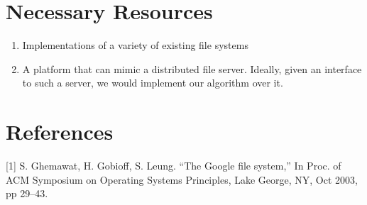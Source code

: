 \documentclass{article}
\begin{document}
\section{Necessary Resources}

\begin{enumerate}
\item Implementations of a variety of existing file systems
\item A platform that can mimic a distributed file server. Ideally, given an interface to such a server, we would implement our algorithm over it.
\end{enumerate}

\section{References}
[1] S. Ghemawat, H. Gobioff, S. Leung. ``The Google file system,'' In Proc.
of ACM Symposium on Operating Systems Principles, Lake George,
NY, Oct 2003, pp 29–43.
\end{document}
